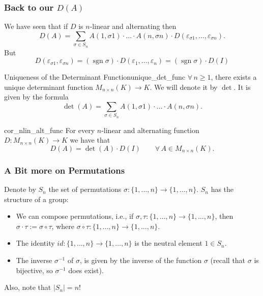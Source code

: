 \subsubsection{Back to our $D(A)$}
We have seen that if $D$ is $n$-linear and alternating then
\[
	D(A) = \sum_{\sigma \in S_n} A(1, \sigma 1)\cdot \hdots \cdot A(n, \sigma n) \cdot D(\varepsilon_{\sigma 1}, \hdots , \varepsilon_{\sigma n}).
\]
But 
\begin{equation}
	\label{eq:det_permut}
	D(\varepsilon_{\sigma 1}, \varepsilon_{\sigma n}) = (\operatorname{sgn}\sigma)\cdot D(\varepsilon_1, \hdots, \varepsilon_n) = (\operatorname{sgn}\sigma)\cdot D(I)
\end{equation}

\begin{theorem}{Uniqueness of the Determinant Function}{unique_det_func}
	$\forall \, n \geq 1$, there exists a unique determinant function $M_{n\times n}(K) \to K$. We will denote it by $\det$. It is given by the formula
	\[
		\det(A) = \sum_{\sigma \in S_n} A(1, \sigma 1)\cdot \hdots \cdot A(n, \sigma n).
	\]
\end{theorem}

\begin{corollary}{}{cor_nlin_alt_func}
	For every $n$-linear and alternating function $D:M_{n\times n}(K) \to K$ we have that
	\[
		D(A) = \det(A)\cdot D(I) \qquad \forall \, A \in M_{n\times n}(K).
	\]
\end{corollary}

\subsubsection{A Bit more on Permutations}
Denote by $S_n$ the set of permutations $\sigma :\{1, \hdots, n\} \to \{1, \hdots, n\}$. $S_n$ has the structure of a group:
\begin{itemize}
	\item[$\bullet$] We can compose permutations, i.e., if $\sigma, \tau :\{1, \hdots, n\} \to \{1, \hdots, n\}$, then $\sigma \cdot \tau := \sigma \circ \tau$, where $\sigma \circ \tau :\{1, \hdots, n\} \to \{1, \hdots, n\}$.
	\item[$\bullet$] The identity $id :\{1, \hdots, n\} \to \{1, \hdots, n\}$ is the neutral element $1 \in S_n$. 
	\item[$\bullet$] The inverse $\sigma^{-1}$ of $\sigma$, is given by the inverse of the function $\sigma$ (recall that $\sigma$ is bijective, so $\sigma^{-1}$ does exist).
\end{itemize}
Also, note that $|S_n| = n!$

